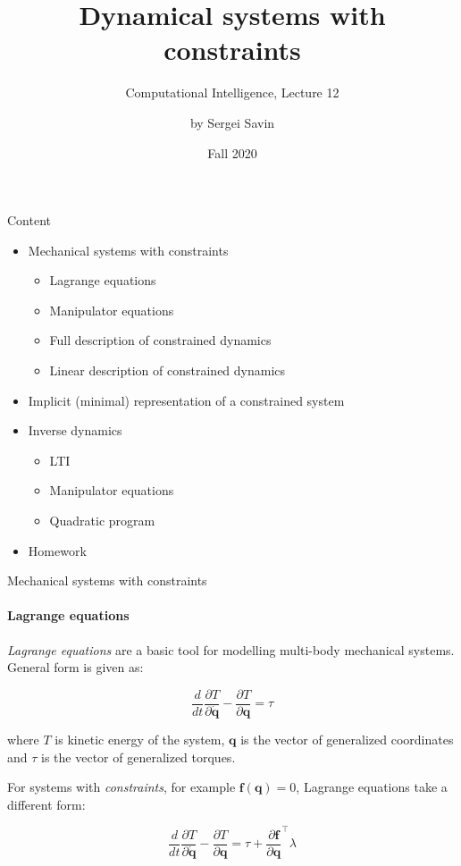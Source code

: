 \documentclass{beamer}
\title{ Dynamical systems with constraints }
\subtitle{Computational Intelligence, Lecture 12}
\author{by Sergei Savin}
\date{Fall 2020}
\begin{document}
\maketitle


\begin{frame}{Content}

\begin{itemize}
\item Mechanical systems with constraints
\begin{itemize}
    \item Lagrange equations
    \item Manipulator equations
    \item Full description of constrained dynamics
    \item Linear description of constrained dynamics
\end{itemize}
\item Implicit (minimal) representation of a constrained system
\item Inverse dynamics
\begin{itemize}
    \item LTI
    \item Manipulator equations
    \item Quadratic program
\end{itemize}
\item Homework
\end{itemize}

\end{frame}



\begin{frame}{Mechanical systems with constraints}
\framesubtitle{Lagrange equations}
\begin{flushleft}

\emph{Lagrange equations} are a basic tool for modelling multi-body mechanical systems. General form is given as:

\begin{equation}
    \frac{d}{dt} \frac{\partial T}{\partial \dot{\mathbf{q}}} - \frac{\partial T}{\partial \mathbf{q}} = \tau
\end{equation}

where $T$ is kinetic energy of the system, $\mathbf{q}$ is the vector of generalized coordinates and $\tau$ is the vector of generalized torques.
 
\bigskip

For systems with \emph{constraints}, for example $\mathbf{f}(\mathbf{q}) = 0$, Lagrange equations take a different form:

\begin{equation}
    \frac{d}{dt} \frac{\partial T}{\partial \dot{\mathbf{q}}} - \frac{\partial T}{\partial \mathbf{q}} = \tau + \frac{\partial \mathbf{f}}{\partial \mathbf{q}}^\top \lambda
\end{equation}
 
\end{flushleft}
\end{frame}
\end{document}

